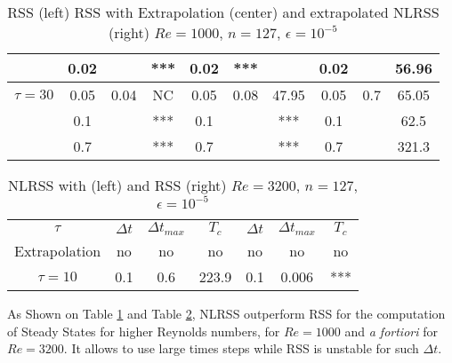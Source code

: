 \documentclass[11pt]{article}
\begin{document}
{\begin{table}[h!]
\begin{center}
\begin{tabular}{|c||c|c|c||c|c|c||c|c|c|}
                  &  0.02       &        &   ***  &     0.02      & ***       &    & 0.02 &   & 56.96 \\ 
\hline 
\hline  
$\tau = 30$     &0.05 &0.04 & NC  &       0.05&0.08&47.95&  0.05 & 0.7 & 65.05 \\ 
\hline
                     & 0.1   &      &***&  0.1&&***&0.1 &   & 62.5 \\ 
\hline
                     & 0.7   &      &*** &0.7   &&*** &  0.7 &   & 321.3 \\ 
\hline 
\end{tabular}
\caption{RSS (left)   RSS with   Extrapolation (center) and extrapolated NLRSS  (right) $Re=1000$, $n=127$, $\epsilon=10^{-5}$}
\label{tab6}
\end{center}
\end{table}
\begin{table}[h!]
\begin{center}
\begin{tabular}{|c||c|c|c||c|c|c|}
\hline
$\tau$ & $\Delta t$ & $\Delta t_{max}$ & $T_c$ & $\Delta t$ & $\Delta t_{max}$ & $T_c$\\
Extrapolation & no  & no  & no  & no& no& no\\
\hline
$\tau = 10$    & 0.1 &  0.6 & 223.9 &  0.1& 0.006 & ***\\ 
\hline
\end{tabular}
\caption{NLRSS with (left)  and RSS  (right) $Re=3200$, $n=127$, $\epsilon=10^{-5}$}
\label{tab7}
\end{center}
\end{table}

As Shown on Table \ref{tab6} and Table \ref{tab7}, NLRSS outperform RSS for the computation of  Steady States for higher Reynolds numbers, for $Re=1000$ and {\it a fortiori} for $Re=3200$. It allows to use large times steps while RSS is  unstable for such $\Delta t$.
}
\end{document}
